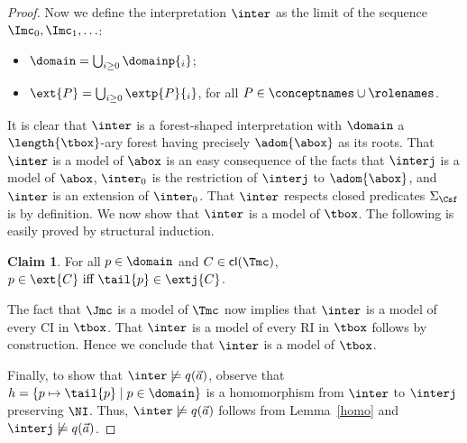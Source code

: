 \documentclass{lmcs}
\theoremstyle{definition}
\newtheorem*{claim*}{Claim}
\let\OriginalQedSymbol\qedsymbol
\renewcommand{\qedsymbol}{\OriginalQedSymbol\setcounter{claim}{0}}
\let\NormalQedSymbol\qedsymbol
\newenvironment{clmproof}[1]{\renewcommand{\qedsymbol}{$\dashv$}\begin{proof}[Proof of claim.]\space#1}{\end{proof}\renewcommand{\qedsymbol}{\NormalQedSymbol}}
\begin{document}
\begin{proof}
  Now we define the interpretation $\inter$ as the limit of the sequence $\Imc_{0},\Imc_{1},\ldots$:
  \begin{itemize}
  \item $\domain=\bigcup_{i\geq 0}\domainp{_i}$;
  \item $\ext{P}=\bigcup_{i\geq 0}\extp{P}{_i}$, for all
    $P\in\conceptnames\cup\rolenames$.
  \end{itemize}

  It is clear that $\inter$ is a forest-shaped interpretation with 
  $\domain$ a $\length{\tbox}$-ary forest having precisely 
  $\adom{\abox}$ as its roots. That $\inter$ is a model of $\abox$ is 
  an easy consequence of the facts that $\interj$ is a model of 
  $\abox$, $\inter_{0}$ is the restriction of $\interj$ to 
  $\adom{\abox}$, and $\inter$ is an extension of $\inter_{0}$. That 
  $\inter$ respects closed predicates $\Sigma_\Csf$ is by definition. 
  We now show that $\inter$ is a model of $\tbox$. The following is easily proved by structural induction.
  
  \begin{claim*}
    For all $p\in\domain$ and $C\in {\sf cl}(\Tmc)$, $p\in\ext{C}
    \text{ iff } \tail{p}\in\extj{C}$.
  \end{claim*}

    
The fact that $\Jmc$ is a model of $\Tmc$ now implies that 
$\inter$ is a model of every CI in $\tbox$. That 
$\inter$ is a model of every RI in $\tbox$ follows by construction.
Hence we conclude that $\inter$ is a model of $\tbox$.

Finally, to show that $\inter\not\models q(\vec{a})$, observe that 
$h=\{p\mapsto\tail{p}\mid p\in\domain\}$ is a homomorphism from $\inter$ to 
$\interj$ preserving $\NI$. Thus, $\inter\not\models q(\vec{a})$ follows from Lemma~\ref{homo}
and $\interj\not\models q(\vec{a})$.
\end{proof}
\end{document}
